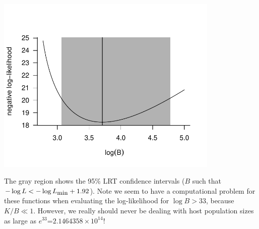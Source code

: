 \documentclass{article}\usepackage[]{graphicx}\usepackage[]{color}
\makeatletter
\newenvironment{kframe}{%
 \def\at@end@of@kframe{}%
 \ifinner\ifhmode%
  \def\at@end@of@kframe{\end{minipage}}%
  \begin{minipage}{\columnwidth}%
 \fi\fi%
 \def\FrameCommand##1{\hskip\@totalleftmargin \hskip-\fboxsep
 \colorbox{shadecolor}{##1}\hskip-\fboxsep
     \hskip-\linewidth \hskip-\@totalleftmargin \hskip\columnwidth}%
 \MakeFramed {\advance\hsize-\width
   \@totalleftmargin\z@ \linewidth\hsize
   \@setminipage}}%
 {\par\unskip\endMakeFramed%
 \at@end@of@kframe}
\newenvironment{knitrout}{}{} %
\makeatother
\begin{document}
\begin{knitrout}
\color{fgcolor}\begin{kframe}


{\ttfamily\noindent\color{warningcolor}{\#\# Warning: package 'bbmle' was built under R version 3.2.5}}

{\ttfamily\noindent\color{warningcolor}{\#\# Warning: replacing previous import by 'stats::na.omit' when loading 'bbmle'}}\end{kframe}
\includegraphics[width=0.8\textwidth]{figure/unnamed-chunk-1-1} 

\end{knitrout}

The gray region shows the 95\% LRT confidence intervals
($B$ such that $-\log L < -\log L_{\mbox{\small min}} + 1.92$).
Note we seem to have a computational
problem for these functions when evaluating the log-likelihood
for $\log B > 33$,
because $K/B \ll 1$. However, we really
should never be dealing with host population sizes
as large as $e^{33}$=\ensuremath{2.1464358\times 10^{14}}!
\end{document}

